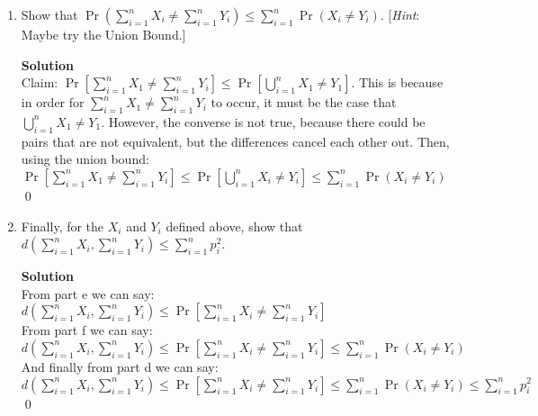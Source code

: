\documentclass[11pt]{article}
\newenvironment{Parts}{\begin{enumerate}[label=(\alph*)]}{\end{enumerate}}
\newcommand*{\Part}{\item}
\begin{document}
\begin{Parts}
    \Part Show that $\Pr(\sum_{i=1}^n X_i \neq \sum_{i=1}^n Y_i) \leq \sum_{i=1}^n \Pr(X_i \neq Y_i)$. [\textit{Hint}: Maybe try the Union Bound.]
\begin{mdframed} \textbf{Solution} \\
Claim: $\Pr[\sum_{i=1}^nX_1 \neq \sum_{i=1}^nY_i] \leq \Pr[\bigcup_{i=1}^nX_1 \neq Y_1]$. This is because in order for $\sum_{i=1}^nX_1 \neq \sum_{i=1}^nY_i$ to occur, it must be the case that $\bigcup_{i=1}^nX_1 \neq Y_1$. However, the converse is not true, because there could be pairs that are not equivalent, but the differences cancel each other out. Then, using the union bound: \\
$\Pr[\sum_{i=1}^nX_1 \neq \sum_{i=1}^nY_i] \leq \Pr[\bigcup_{i=1}^nX_i\neq Y_i] \leq \sum_{i=1}^n \Pr(X_i \neq Y_i)$ \qed
\end{mdframed}

    \Part Finally, for the $X_i$ and $Y_i$ defined above, show that $d(\sum_{i=1}^n X_i, \sum_{i=1}^n Y_i) \leq \sum_{i=1}^n p_i^2$.
\begin{mdframed} \textbf{Solution} \\
From part e we can say: \\
$d(\sum_{i=1}^n X_i, \sum_{i=1}^n Y_i) \leq \Pr[\sum_{i=1}^n X_i \neq \sum_{i=1}^n Y_i]$ \\
From part f we can say: \\
$d(\sum_{i=1}^n X_i, \sum_{i=1}^n Y_i) \leq \Pr[\sum_{i=1}^n X_i \neq \sum_{i=1}^n Y_i] \leq \sum_{i=1}^n \Pr(X_i \neq Y_i)$ \\
And finally from part d we can say: \\
$d(\sum_{i=1}^n X_i, \sum_{i=1}^n Y_i) \leq \Pr[\sum_{i=1}^n X_i \neq \sum_{i=1}^n Y_i] \leq \sum_{i=1}^n \Pr(X_i \neq Y_i) \leq \sum_{i=1}^n p_i^2$ \qed
\end{mdframed}
\end{Parts}
\end{document}
